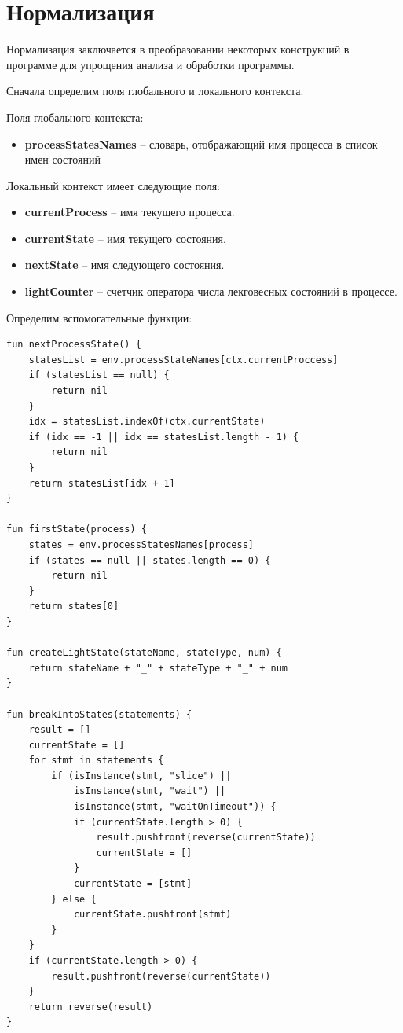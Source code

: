 \section{Нормализация}
Нормализация заключается в преобразовании некоторых конструкций в программе для упрощения анализа и обработки программы.

Сначала определим поля глобального и локального контекста.

Поля глобального контекста:
\begin{itemize}
    \item \textbf{processStatesNames} -- словарь, отображающий имя процесса  в список имен состояний
\end{itemize}

Локальный контекст имеет следующие поля:
    \begin{itemize}
        \item \textbf{currentProcess} -- имя текущего процесса.
        \item \textbf{currentState} -- имя текущего состояния.
        \item \textbf{nextState} -- имя следующего состояния.
        \item \textbf{lightСounter} -- счетчик оператора числа лекговесных состояний в процессе.
    \end{itemize}
    
Определим вспомогательные функции:
\begin{lstlisting}
fun nextProcessState() {
    statesList = env.processStateNames[ctx.currentProccess]
    if (statesList == null) {
        return nil
    }
    idx = statesList.indexOf(ctx.currentState)
    if (idx == -1 || idx == statesList.length - 1) {
        return nil
    }
    return statesList[idx + 1]
}

fun firstState(process) {
    states = env.processStatesNames[process]
    if (states == null || states.length == 0) {
        return nil
    }
    return states[0]
}

fun createLightState(stateName, stateType, num) {
    return stateName + "_" + stateType + "_" + num
}

fun breakIntoStates(statements) {
    result = []
    currentState = []
    for stmt in statements {
        if (isInstance(stmt, "slice") ||
            isInstance(stmt, "wait") ||
            isInstance(stmt, "waitOnTimeout")) {
            if (currentState.length > 0) {
                result.pushfront(reverse(currentState))
                currentState = []
            }
            currentState = [stmt]
        } else {
            currentState.pushfront(stmt)
        }
    }
    if (currentState.length > 0) {
        result.pushfront(reverse(currentState))
    }
    return reverse(result)
}
\end{lstlisting}

